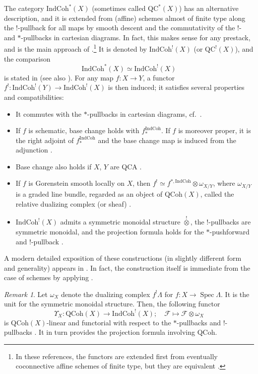 \documentclass{amsart}
\theoremstyle{definition}
\theoremstyle{remark}
\newtheorem{remark}[theorem]{Remark}
\numberwithin{equation}{section}
\DeclareMathOperator{\Spec}{Spec}
\newcommand{\mc}{\mathcal}
\newcommand{\IndCoh}{\mathrm{IndCoh}}
\newcommand{\QCoh}{\mathrm{QCoh}}
\begin{document}
The category $\IndCoh^*(X)$ (sometimes called $\mathrm{QC}^*(X)$) has an alternative description, and it is extended from (affine) schemes almost of finite type along the $!$-pullback for all maps by smooth descent and the commutativity of the $!$- and $*$-pullbacks in cartesian diagrams. In fact, this makes sense for any prestack, and is the main approach of \cite{GaitsgoryIndCohSheaves, GRI}.\footnote{In these references, the functors are extended first from eventually coconnective affine schemes of finite type, but they are equivalent \cite[Corollary 10.2.2]{GaitsgoryIndCohSheaves}.} It is denoted by $\IndCoh^!(X)$ (or $\mathrm{QC}^!(X)$), and the comparison
\[
\IndCoh^* (X)\simeq \IndCoh^! (X)
\]
is stated in \cite[Corollary 11.5.3]{GaitsgoryIndCohSheaves} (see also \cite[Theorem 2.9.12(i), Lemma 2.10.8(i)]{HansenMann}). For any map $f\colon X\to Y$, a functor $f^!\colon \IndCoh^! (Y)\to \IndCoh^!(X)$ is then induced; it satisfies several properties and compatibilities:
\begin{itemize}
    \item It commutes with the $*$-pullbacks in cartesian diagrams, cf.~\cite[Corollary 11.5.3]{GaitsgoryIndCohSheaves}. 
    \item If $f$ is schematic, base change holds with $f_*^{\IndCoh}$. If $f$ is moreover proper, it is the right adjoint of $f_*^{\IndCoh}$ and the base change map is induced from the adjunction \cite[\S 5.3.4.4]{GRI}. 
    \item Base change also holds if $X$, $Y$ are QCA \cite[Corollary 3.7.14]{DrinfeldGaitsgory}. 
    \item If $f$ is Gorenstein smooth locally on $X$, then $f^!\simeq f^{*, \IndCoh}\otimes \omega_{X/Y}$, where $\omega_{X/Y}$ is a graded line bundle, regarded as an object of $\QCoh(X)$, called the relative dualizing complex (or sheaf) \cite[(3.12)]{DrinfeldGaitsgory}. 
    \item $\IndCoh^!(X)$ admits a symmetric monoidal structure $\overset{!}{\otimes}$, the $!$-pullbacks are symmetric monoidal, and the projection formula holds for the $*$-pushforward and $!$-pullback \cite[\S 5.4.1]{GRI}. 
\end{itemize}

A modern detailed exposition of these constructions (in slightly different form and generality) appears in \cite{HansenMann}. In fact, the construction itself is immediate from the case of schemes by applying \cite[Theorem 3.4.11]{HeyerMann}. 

\begin{remark}
Let $\omega_X$ denote the dualizing complex $f^! \Lambda$ for $f\colon X\to \Spec \Lambda$. It is the unit for the symmetric monoidal structure. Then, the following functor
\[
\Upsilon_X\colon \QCoh(X) \to \IndCoh^!(X);\quad \mc F \mapsto \mc F \otimes \omega_X
\]
is $\QCoh(X)$-linear and functorial with respect to the $*$-pullbacks and $!$-pullbacks \cite[\S 6.3.3]{GRI}. It in turn provides the projection formula involving $\QCoh$.     
\end{remark}
\end{document}
